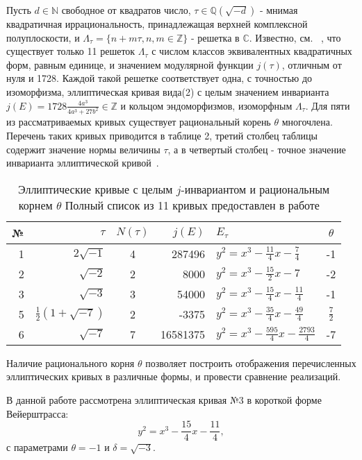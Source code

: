 Пусть $d \in \mathbb{N}$ свободное от квадратов число, $\tau \in \mathbb{Q}(\sqrt{-d})$ - мнимая квадратичная иррациональность, принадлежащая верхней комплексной полуплоскости, и $\Lambda_{\tau}=\{n+m \tau, n, m \in \mathbb{Z}\}$ - решетка в $\mathbb{C}$. 
Известно, см. ~\cite{endo-reshetka}, что существует только 11 решеток $\Lambda_{\tau}$ с числом классов эквивалентных квадратичных форм, равным единице, и значением модулярной функции $j(\tau)$, отличным от нуля и 1728. 
Каждой такой решетке соответствует одна, с точностью до изоморфизма, эллиптическая кривая вида(2) с целым значением инварианта $j(E)=1728 \frac{4 a^{3}}{4 a^{3}+27 b^{2}} \in \mathbb{Z}$ и кольцом эндоморфизмов, изоморфным $\Lambda_{\tau}$. 
Для пяти из рассматриваемых кривых существует рациональный корень $\theta$ многочлена. 
Перечень таких кривых приводится в таблице 2, третий столбец таблицы содержит значение нормы величины $\tau$, а в четвертый столбец - точное значение инварианта эллиптической кривой~\cite{nesterenko-disser}.

\begin{table}[h]
    \centering
    \begin{tabular}{|r|r|c|r|l|c|}
    \hline
    № & $\tau$ & $N(\tau)$ & $j(E)$ & $E_{\tau}$ & $\theta$ \\
    \hline
    1 & $2 \sqrt{-1}$ & 4 & 287496 & $y^{2}=x^{3}-\frac{11}{4} x-\frac{7}{4}$ & -1 \\
    \hline
    2 & $\sqrt{-2}$ & 2 & 8000 & $y^{2}=x^{3}-\frac{15}{2} x-7$ & -2 \\
    \hline
    3 & $\sqrt{-3}$ & 3 & 54000 & $y^{2}=x^{3}-\frac{15}{4} x-\frac{11}{4}$ & -1 \\
    \hline
    5 & $\frac{1}{2}(1+\sqrt{-7})$ & 2 & -3375 & $y^{2}=x^{3}-\frac{35}{4} x-\frac{49}{4}$ & $\frac{7}{2}$ \\
    \hline
    6 & $\sqrt{-7}$ & 7 & 16581375 & $y^{2}=x^{3}-\frac{595}{4} x-\frac{2793}{4}$ & -7 \\
    \hline
    \end{tabular}
    \caption{ Эллиптические кривые с целым $j$-инвариантом и рациональным корнем $\theta$ Полный список из 11 кривых предоставлен в работе ~\cite{nesterenko-disser}}
\end{table}

Наличие рационального корня $\theta$ позволяет построить отображения перечисленных эллиптических кривых в различные формы, и провести сравнение реализаций.

В данной работе рассмотрена эллиптическая кривая №3 в короткой форме Вейерштрасса:
\begin{equation*}
    y^2 = x^3 - \frac{15}{4}x - \frac{11}{4},
\end{equation*}
с параметрами \( \theta = -1 \) и \( \delta = \sqrt{-3} \).


